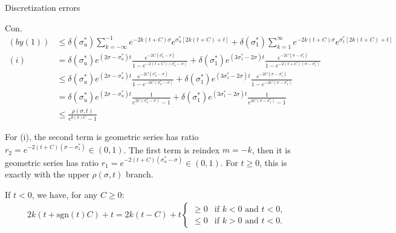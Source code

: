 \documentclass{beamer}
\begin{document}
\begin{frame}{Discretization errors}


    {\footnotesize \scriptsize
    \par Con.
    \begin{align*}
        (by (1)) &\leq \delta(\sigma_{u}^{*}) \sum_{k=-\infty}^{-1} e^{-2k(t+C)\sigma} e^{\sigma_{u}^{*}[2k(t+C)+t]} 
        + \delta(\sigma_{1}^{*}) \sum_{k=1}^{\infty} e^{-2k(t+C)\sigma} e^{\sigma_{1}^{*}[2k(t+C)+t]}\\
        (i)&= \delta(\sigma_{u}^{*}) e^{(2\sigma - \sigma_{u}^{*})t} \frac{e^{-2C(\sigma_{u}^{*}-\sigma)}}{1 - e^{-2(t+C)(\sigma_{u}^{*}-\sigma)}} 
        + \delta(\sigma_{1}^{*}) e^{(3\sigma_{1}^{*}-2\sigma)t} \frac{e^{-2C(\sigma - \sigma_{1}^{*})}}{1 - e^{-2(t+C)(\sigma - \sigma_{1}^{*})}}\\
        & \leq \delta(\sigma_{u}^{*}) e^{(2\sigma - \sigma_{u}^{*})t} \frac{e^{-2C(\sigma_{u}^{*}-\sigma)}}{1 - e^{-2C(\sigma_{u}^{*}-\sigma)}} 
        + \delta(\sigma_{1}^{*}) e^{(3\sigma_{1}^{*}-2\sigma)t} \frac{e^{-2C(\sigma - \sigma_{1}^{*})}}{1 - e^{-2C(\sigma - \sigma_{1}^{*})}}\\
        & = \delta(\sigma_{u}^{*}) e^{(2\sigma - \sigma_{u}^{*})t} \frac{1}{e^{2C(\sigma_{u}^{*}-\sigma)} - 1} 
        + \delta(\sigma_{1}^{*}) e^{(3\sigma_{1}^{*}-2\sigma)t} \frac{1}{e^{2C(\sigma - \sigma_{1}^{*})} - 1}\\
        &\leq \frac{\rho(\sigma, t)}{e^{\theta(\sigma)C} - 1}
    \end{align*}
    \par \pause  For (i), the second term is geometric series has ratio \( r_2 = e^{-2(t+C)(\sigma - \sigma_1^*)} \in (0, 1) \). The first term is reindex $m = -k$, 
    then it is geometric series has ratio \( r_1 = e^{-2(t+C)(\sigma_{u}^{*}- \sigma)} \in (0, 1) \). For $t\geq0$, 
    this is exactly with the upper $\rho(\sigma,t)$ branch.
        \par If \( t < 0 \), we have, for any \( C \geq 0 \):
    \begin{align*}
        2k(t + \text{sgn}(t)C) + t = 2k(t - C) + t 
        \begin{cases} 
        \geq 0 & \text{if } k < 0 \text{ and } t < 0, \\ 
        \leq 0 & \text{if } k > 0 \text{ and } t < 0.
        \end{cases}
    \end{align*}
    }
    
\end{frame}
\end{document}
